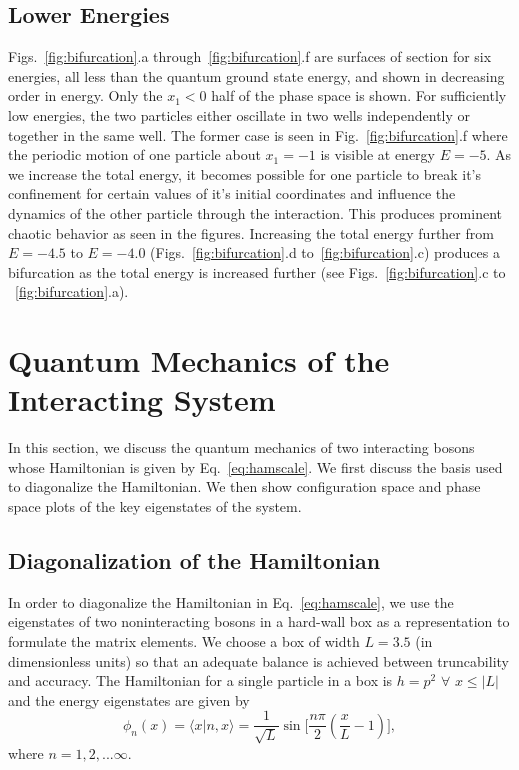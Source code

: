 \documentclass{article}
\begin{document}
%
%
\subsection{Lower Energies}
%
%


Figs.~\ref{fig:bifurcation}.a through~\ref{fig:bifurcation}.f are surfaces of section for six energies,  all less than the quantum ground state energy, and shown in decreasing order in energy.  Only the $x_1<0$ half of the phase space is shown. For sufficiently low energies, the two particles either oscillate in two wells independently or together in the same well. The former case is seen in Fig.~\ref{fig:bifurcation}.f where the periodic motion of one particle about $x_1 = -1$ is visible at energy $E = -5$. As we increase the total energy, it becomes possible for one particle to break it's confinement for certain values of it's initial coordinates and influence the dynamics of the other particle through the interaction. This produces prominent chaotic behavior as seen in the figures. Increasing the total energy further from $E = -4.5$ to $E = -4.0$ (Figs.~\ref{fig:bifurcation}.d to~\ref{fig:bifurcation}.c) produces a bifurcation as the total energy is increased further (see Figs.~\ref{fig:bifurcation}.c to ~\ref{fig:bifurcation}.a).

%
%
\section{\label{sec:4} Quantum Mechanics of the Interacting System}
%
%

In this section, we discuss the quantum mechanics of two interacting bosons whose Hamiltonian is given by Eq.~\eqref{eq:hamscale}.  We first discuss the basis used to diagonalize the Hamiltonian. We then show configuration space and phase space plots of the key eigenstates of the system. 

%
\subsection{Diagonalization of the Hamiltonian}
%

In order to diagonalize the Hamiltonian in Eq.~\eqref{eq:hamscale}, we use the eigenstates of two noninteracting bosons in a hard-wall box as a representation to formulate the matrix elements.  We choose a box of width  $L=3.5$ (in dimensionless units)   so that an adequate balance is achieved between truncability and accuracy. The Hamiltonian  for a single particle in a box is $h=p^2$  $\forall$ $x\leq|L|$ and the energy eigenstates are given by 
%
\begin{equation}
\phi_n(x)=\langle x|n,x\rangle=\frac{1}{\sqrt{L}} \sin{\biggl[}{\frac{n\pi}{2}(\frac{x}{L}-1){\biggr]}},
\label{eq:pboxfn}
\end{equation}
%
where $n=1,2,...\infty$. 
\end{document}
